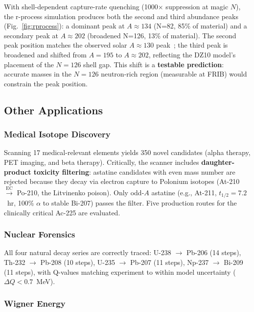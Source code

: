 \documentclass[twocolumn,letterpaper,10pt]{article}
\begin{document}
With shell-dependent capture-rate quenching (1000$\times$ suppression at
magic $N$), the r-process simulation produces both the second and third
abundance peaks (Fig.~\ref{fig:rprocess}): a dominant peak at $A \approx
134$ (N=82, 85\% of material) and a secondary peak at $A \approx 202$
(broadened N=126, 13\% of material). The second peak position matches the
observed solar $A \approx 130$ peak~\cite{cowan2021}; the third peak is
broadened and shifted from $A=195$ to $A \approx 202$, reflecting the
DZ10 model's placement of the $N=126$ shell gap. This shift is a
\textbf{testable prediction}: accurate masses in the $N=126$ neutron-rich
region (measurable at FRIB) would constrain the peak position.

\subsection{Other Applications}

\subsubsection{Medical Isotope Discovery}

Scanning 17 medical-relevant elements yields 350 novel candidates (alpha
therapy, PET imaging, and beta therapy). Critically, the scanner includes
\textbf{daughter-product toxicity filtering}: astatine candidates with even
mass number are rejected because they decay via electron capture to Polonium
isotopes (At-210 $\xrightarrow{\text{EC}}$ Po-210, the Litvinenko poison).
Only odd-$A$ astatine (e.g., At-211, $t_{1/2} = 7.2$~hr, 100\% $\alpha$
to stable Bi-207) passes the filter. Five production routes for the
clinically critical Ac-225 are evaluated.

\subsubsection{Nuclear Forensics}

All four natural decay series are correctly traced: U-238 $\to$ Pb-206 (14
steps), Th-232 $\to$ Pb-208 (10 steps), U-235 $\to$ Pb-207 (11 steps),
Np-237 $\to$ Bi-209 (11 steps), with Q-values matching experiment to
within model uncertainty ($\Delta Q < 0.7$~MeV).

\subsubsection{Wigner Energy}
\end{document}
